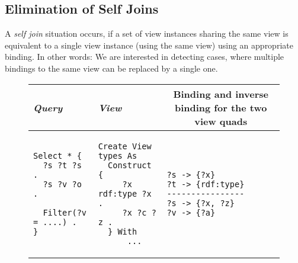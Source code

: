 \documentclass[a4paper,twoside,bibtotoc,abstracton,12pt,BCOR=15mm]{scrreprt}
\newcommand{\todo}[1]{\textbf{ToDo: \textit{#1}}}
\begin{document}


\subsection{Elimination of Self Joins}
A \emph{self join} situation occurs, if a set of view instances sharing the same view
is equivalent to a single view instance (using the same view) using an appropriate binding.
In other words: We are interested in detecting cases, where multiple bindings to the same view can be replaced by a single one.

\begin{figure}[!h]
\centering
\begin{tabular}{llll}
\toprule
\emph{Query} & \emph{View} & \multicolumn{2}{c}{Binding and inverse binding for the two view quads} \\ 
\midrule

\begin{minipage}{3cm}
\begin{scriptsize}
\begin{verbatim}
Select * {
  ?s ?t ?s .
  ?s ?v ?o .
  
  Filter(?v = ....) .
}
\end{verbatim}
\end{scriptsize}
\end{minipage}

&

\begin{minipage}{3cm}
\begin{scriptsize}
\begin{verbatim}
Create View types As
  Construct {
     ?x rdf:type ?x .
     ?x ?c ?z .
  } With
      ...
\end{verbatim}
\end{scriptsize}
\end{minipage}

&

\begin{minipage}{3cm}
\begin{scriptsize}
\begin{verbatim}
?s -> {?x}
?t -> {rdf:type}
----------------
?s -> {?x, ?z}
?v -> {?a}
\end{verbatim}
\end{scriptsize}
\end{minipage}


\end{tabular}
\end{figure}
\end{document}
